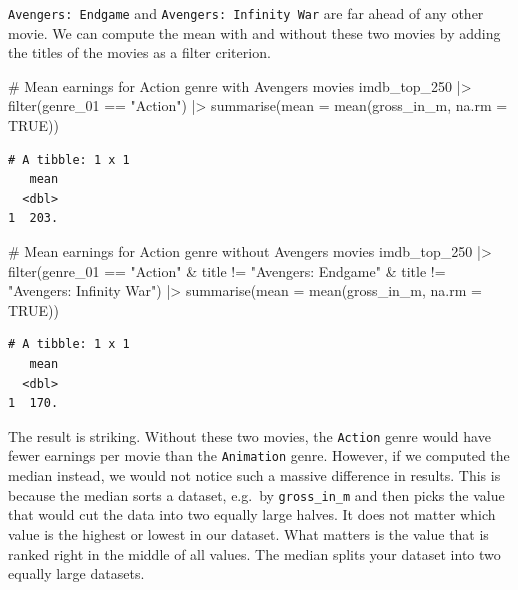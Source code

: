 \documentclass[
  letterpaper,
]{krantz}
\makeatletter
\newenvironment{Shaded}{\begin{snugshade}}{\end{snugshade}}
\newcommand{\AttributeTok}[1]{\textcolor[rgb]{0.40,0.45,0.13}{#1}}
\newcommand{\CommentTok}[1]{\textcolor[rgb]{0.37,0.37,0.37}{#1}}
\newcommand{\ConstantTok}[1]{\textcolor[rgb]{0.56,0.35,0.01}{#1}}
\newcommand{\FunctionTok}[1]{\textcolor[rgb]{0.28,0.35,0.67}{#1}}
\newcommand{\NormalTok}[1]{\textcolor[rgb]{0.00,0.23,0.31}{#1}}
\newcommand{\SpecialCharTok}[1]{\textcolor[rgb]{0.37,0.37,0.37}{#1}}
\newcommand{\StringTok}[1]{\textcolor[rgb]{0.13,0.47,0.30}{#1}}
\newenvironment{kframe}{%
\medskip{}
\setlength{\fboxsep}{.8em}
 \def\at@end@of@kframe{}%
 \ifinner\ifhmode%
  \def\at@end@of@kframe{\end{minipage}}%
  \begin{minipage}{\columnwidth}%
 \fi\fi%
 \def\FrameCommand##1{\hskip\@totalleftmargin \hskip-\fboxsep
 \colorbox{shadecolor}{##1}\hskip-\fboxsep
     \hskip-\linewidth \hskip-\@totalleftmargin \hskip\columnwidth}%
 \MakeFramed {\advance\hsize-\width
   \@totalleftmargin\z@ \linewidth\hsize
   \@setminipage}}%
 {\par\unskip\endMakeFramed%
 \at@end@of@kframe}
\renewenvironment{Shaded}{\begin{kframe}}{\end{kframe}}
\makeatother
\begin{document}
\texttt{Avengers:\ Endgame} and \texttt{Avengers:\ Infinity\ War} are
far ahead of any other movie. We can compute the mean with and without
these two movies by adding the titles of the movies as a filter
criterion.

\begin{Shaded}
\begin{Highlighting}[]
\CommentTok{\# Mean earnings for Action genre with Avengers movies}
\NormalTok{imdb\_top\_250 }\SpecialCharTok{|\textgreater{}}
  \FunctionTok{filter}\NormalTok{(genre\_01 }\SpecialCharTok{==} \StringTok{"Action"}\NormalTok{) }\SpecialCharTok{|\textgreater{}}
  \FunctionTok{summarise}\NormalTok{(}\AttributeTok{mean =} \FunctionTok{mean}\NormalTok{(gross\_in\_m, }\AttributeTok{na.rm =} \ConstantTok{TRUE}\NormalTok{))}
\end{Highlighting}
\end{Shaded}

\begin{verbatim}
# A tibble: 1 x 1
   mean
  <dbl>
1  203.
\end{verbatim}

\begin{Shaded}
\begin{Highlighting}[]
\CommentTok{\# Mean earnings for Action genre without Avengers movies}
\NormalTok{imdb\_top\_250 }\SpecialCharTok{|\textgreater{}}
  \FunctionTok{filter}\NormalTok{(genre\_01 }\SpecialCharTok{==} \StringTok{"Action"} \SpecialCharTok{\&}
\NormalTok{           title }\SpecialCharTok{!=} \StringTok{"Avengers: Endgame"} \SpecialCharTok{\&}
\NormalTok{           title }\SpecialCharTok{!=} \StringTok{"Avengers: Infinity War"}\NormalTok{) }\SpecialCharTok{|\textgreater{}}
  \FunctionTok{summarise}\NormalTok{(}\AttributeTok{mean =} \FunctionTok{mean}\NormalTok{(gross\_in\_m, }\AttributeTok{na.rm =} \ConstantTok{TRUE}\NormalTok{))}
\end{Highlighting}
\end{Shaded}

\begin{verbatim}
# A tibble: 1 x 1
   mean
  <dbl>
1  170.
\end{verbatim}

The result is striking. Without these two movies, the \texttt{Action}
genre would have fewer earnings per movie than the \texttt{Animation}
genre. However, if we computed the median instead, we would not notice
such a massive difference in results. This is because the median sorts a
dataset, e.g.~by \texttt{gross\_in\_m} and then picks the value that
would cut the data into two equally large halves. It does not matter
which value is the highest or lowest in our dataset. What matters is the
value that is ranked right in the middle of all values. The median
splits your dataset into two equally large datasets.
\end{document}
